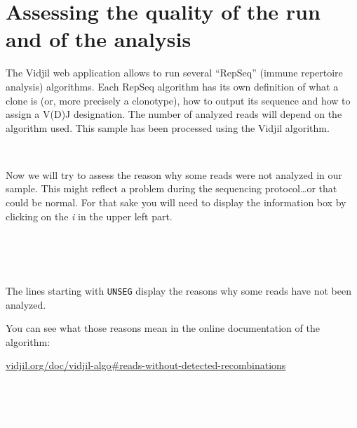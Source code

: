 
\section{Assessing the quality of the run and of the analysis}
The Vidjil web application allows to run several ``RepSeq'' (immune repertoire analysis) algorithms.
Each RepSeq algorithm has its own definition of what a clone is (or, more precisely
a clonotype), how to output its sequence and how to assign a V(D)J designation.
The number of analyzed reads will depend on the algorithm used.
This sample has been processed using the Vidjil algorithm.



\textcolor{white}{ In the upper left corner, you can see an information panel with }

Now we will try to assess the reason why some reads were not analyzed in our
sample.
This might reflect a problem during the sequencing protocol\dots or that could
be normal.
For that sake you will need to display the information box by clicking on the
\textit{i} in the upper left part.

\textcolor{white}{ In the Analysis log row under "av.len"\\*
IGH -> 314.5\\* 
TRG -> 197.6 }

The lines starting with \texttt{UNSEG} display the reasons why some reads have
not been analyzed.

You can see what those reasons mean in the online documentation of the
algorithm:

 \centerline{\href{http://www.vidjil.org/doc/vidjil-algo/\#reads-without-detected-recombinations}{vidjil.org/doc/vidjil-algo\#reads-without-detected-recombinations}}



\textcolor{white}{ 1. The algorythm was not able to find a V or a J for most of the unsegmeneted reads.\\*
2. The may be too short to cover enough of the V or J genes to be detected. }